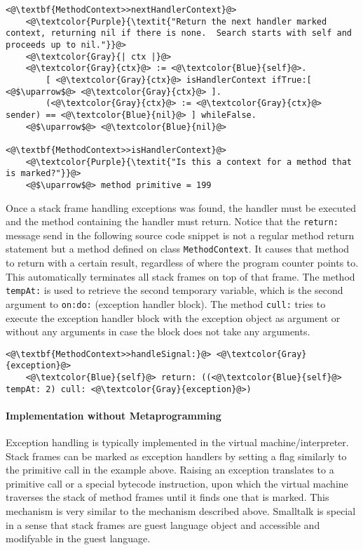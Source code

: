 \documentclass[12pt]{article}
\begin{document}
\begin{lstlisting}
<@\textbf{MethodContext>>nextHandlerContext}@>
    <@\textcolor{Purple}{\textit{"Return the next handler marked context, returning nil if there is none.  Search starts with self and proceeds up to nil."}}@>
    <@\textcolor{Gray}{| ctx |}@>
    <@\textcolor{Gray}{ctx}@> := <@\textcolor{Blue}{self}@>.
        [ <@\textcolor{Gray}{ctx}@> isHandlerContext ifTrue:[ <@$\uparrow$@> <@\textcolor{Gray}{ctx}@> ].
        (<@\textcolor{Gray}{ctx}@> := <@\textcolor{Gray}{ctx}@> sender) == <@\textcolor{Blue}{nil}@> ] whileFalse.
    <@$\uparrow$@> <@\textcolor{Blue}{nil}@>
    
<@\textbf{MethodContext>>isHandlerContext}@>
    <@\textcolor{Purple}{\textit{"Is this a context for a method that is marked?"}}@>
    <@$\uparrow$@> method primitive = 199
\end{lstlisting}

Once a stack frame handling exceptions was found, the handler must be executed and the method containing the handler must return. Notice that the \texttt{return:} message send in the following source code snippet is not a regular method return statement but a method defined on class \texttt{MethodContext}. It causes that method to return with a certain result, regardless of where the program counter points to. This automatically terminates all stack frames on top of that frame. The method \texttt{tempAt:} is used to retrieve the second temporary variable, which is the second argument to \texttt{on:do:} (exception handler block). The method \texttt{cull:} tries to execute the exception handler block with the exception object as argument or without any arguments in case the block does not take any arguments.

\begin{lstlisting}
<@\textbf{MethodContext>>handleSignal:}@> <@\textcolor{Gray}{exception}@>
    <@\textcolor{Blue}{self}@> return: ((<@\textcolor{Blue}{self}@> tempAt: 2) cull: <@\textcolor{Gray}{exception}@>)
\end{lstlisting}

\paragraph{Implementation without Metaprogramming}
Exception handling is typically implemented in the virtual machine/interpreter. Stack frames can be marked as exception handlers by setting a flag similarly to the primitive call in the example above. Raising an exception translates to a primitive call or a special bytecode instruction, upon which the virtual machine traverses the stack of method frames until it finds one that is marked. This mechanism is very similar to the mechanism described above. Smalltalk is special in a sense that stack frames are guest language object and accessible and modifyable in the guest language.
\end{document}
